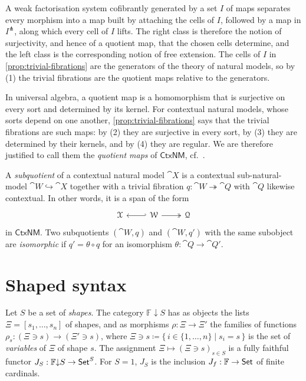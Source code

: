 A weak factorisation system cofibrantly generated by a set $I$ of maps separates every morphism into a map built by attaching the cells of $I$, followed by a map in $I^{\pitchfork}$, along which every cell of $I$ lifts. The right class is therefore the notion of surjectivity, and hence of a quotient map, that the chosen cells determine, and the left class is the corresponding notion of free extension. The cells of $I$ in \cref{prop:trivial-fibrations} are the generators of the theory of natural models, so by (1) the trivial fibrations are the quotient maps relative to the generators.

In universal algebra, a quotient map is a homomorphism that is surjective on every sort and determined by its kernel. For contextual natural models, whose sorts depend on one another, \cref{prop:trivial-fibrations} says that the trivial fibrations are such maps: by (2) they are surjective in every sort, by (3) they are determined by their kernels, and by (4) they are regular. We are therefore justified to call them the \emph{quotient maps} of $\mathsf{CtxNM}$, cf.~\cite[Def.~7.4, Lemma~7.15]{Bocquet2023}.

\begin{definition}\label{def:subquotient}
    A \emph{subquotient} of a contextual natural model $\cat{X}$ is a contextual sub-natural-model $\cat{W} \hookrightarrow \cat{X}$ together with a trivial fibration $q : \cat{W} \twoheadrightarrow \cat{Q}$ with $\cat{Q}$ likewise contextual. In other words, it is a span of the form
    \[\begin{tikzcd}
    	{\cat{X}} & {\cat{W} } & {\cat{Q}}
    	\arrow[hook', from=1-2, to=1-1]
    	\arrow[two heads, from=1-2, to=1-3]
    \end{tikzcd}\]
    in $\mathsf{CtxNM}$.
    Two subquotients $(\cat{W}, q)$ and $(\cat{W}, q')$ with the same subobject are \emph{isomorphic} if $q' = \theta \circ q$ for an isomorphism $\theta : \cat{Q} \to \cat{Q}'$.
\end{definition}

\section{Shaped syntax}
\label{sec:shaped-syntax}

\begin{definition}\label{def:sorted-sets}
    Let $S$ be a set of \emph{shapes}. The category $\mathbb{F}{\downarrow}S$ has as objects the lists $\Xi = [s_1, \ldots, s_n]$ of shapes, and as morphisms $\rho : \Xi \to \Xi'$ the families of functions $\rho_s : (\Xi \ni s) \to (\Xi' \ni s)$, where $\Xi \ni s \coloneqq \{\, i \in \{1, \ldots, n\} \mid s_i = s \,\}$ is the set of \emph{variables} of $\Xi$ of shape $s$. The assignment $\Xi \mapsto (\Xi \ni s)_{s \in S}$ is a fully faithful functor $J_S : \mathbb{F}{\downarrow}S \to \mathsf{Set}^S$. For $S = 1$, $J_S$ is the inclusion $J_f : \mathbb{F} \to \mathsf{Set}$ of finite cardinals.
\end{definition}

